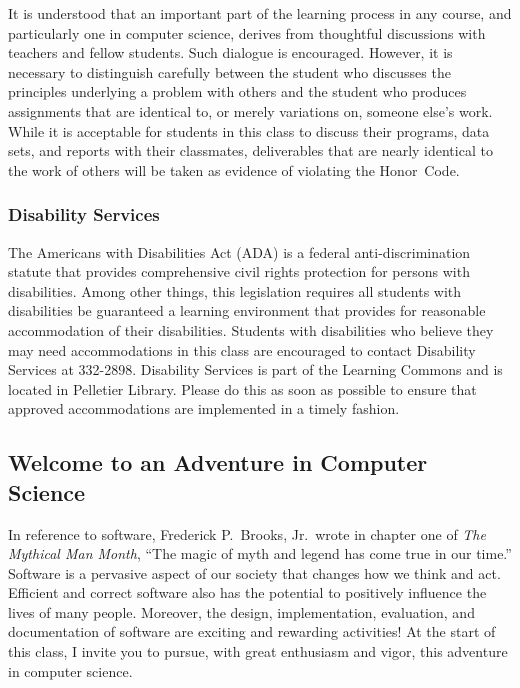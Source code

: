 \noindent It is understood that an important part of the learning process in any course, and particularly one in
computer science, derives from thoughtful discussions with teachers and fellow students.  Such dialogue is encouraged.
However, it is necessary to distinguish carefully between the student who discusses the principles underlying a problem
with others and the student who produces assignments that are identical to, or merely variations on, someone else's
work.  While it is acceptable for students in this class to discuss their programs, data sets, and reports with their
classmates, deliverables that are nearly identical to the work of others will be taken as evidence of violating the
\mbox{Honor Code}.

\subsubsection*{Disability Services}

The Americans with Disabilities Act (ADA) is a federal anti-discrimination statute that provides comprehensive civil
rights protection for persons with disabilities.  Among other things, this legislation requires all students with
disabilities be guaranteed a learning environment that provides for reasonable accommodation of their disabilities.
Students with disabilities who believe they may need accommodations in this class are encouraged to contact Disability
Services at 332-2898.  Disability Services is part of the Learning Commons and is located in Pelletier Library.
Please do this as soon as possible to ensure that approved accommodations are implemented in a timely fashion.


\subsection*{Welcome to an Adventure in Computer Science}

In reference to software, Frederick P.\ Brooks, Jr.\ wrote in chapter one of {\em The Mythical Man Month}, ``The magic
of myth and legend has come true in our time.'' Software is a pervasive aspect of our society that changes how we think
and act.  Efficient and correct software also has the potential to positively influence the lives of many people.
Moreover, the design, implementation, evaluation, and documentation of software are exciting and rewarding activities!
At the start of this class, I invite you to pursue, with great enthusiasm and vigor, this adventure in computer science.


